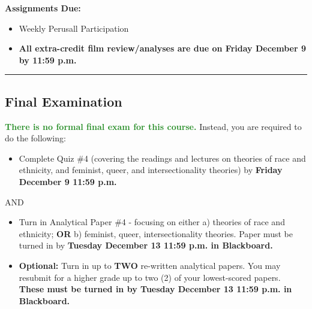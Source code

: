 \documentclass[11pt,]{article}
\providecommand{\tightlist}{%
  \setlength{\itemsep}{0pt}\setlength{\parskip}{0pt}}
\begin{document}
\textbf{Assignments Due:}

\begin{itemize}
\tightlist
\item
  Weekly Perusall Participation
\item
  \textbf{All extra-credit film review/analyses are due on Friday
  December 9 by 11:59 p.m.}
\end{itemize}

\bigbreak
\hrule

\hypertarget{final-examination}{%
\subsection{Final Examination}\label{final-examination}}

\textcolor{ForestGreen}{\bf{There is no formal final exam for this course.}}
Instead, you are required to do the following:

\begin{itemize}
\tightlist
\item
  Complete Quiz \#4 (covering the readings and lectures on theories of
  race and ethnicity, and feminist, queer, and intersectionality
  theories) by \textbf{Friday December 9 11:59 p.m.}
\end{itemize}

AND

\begin{itemize}
\item
  Turn in Analytical Paper \#4 - focusing on either a) theories of race
  and ethnicity; \textbf{OR} b) feminist, queer, intersectionality
  theories. Paper must be turned in by \textbf{Tuesday December 13 11:59
  p.m. in Blackboard.}
\item
  \textcolor{BrickRed}{\bf{Optional:}} Turn in up to \textbf{TWO}
  re-written analytical papers. You may resubmit for a higher grade up
  to two (2) of your lowest-scored papers. \textbf{These must be turned
  in by Tuesday December 13 11:59 p.m. in Blackboard.}
\end{itemize}
\end{document}
